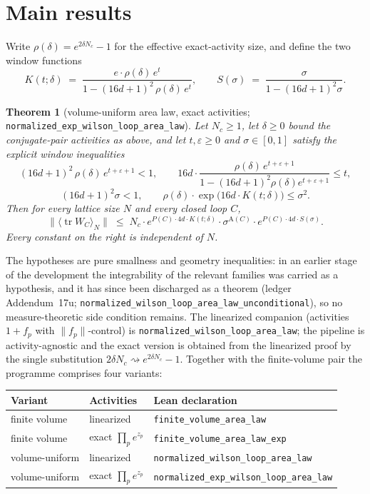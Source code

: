 \documentclass[11pt]{article}
\newtheorem{theorem}{Theorem}[section]
\theoremstyle{remark}
\newcommand{\tr}{\operatorname{tr}}
\newcommand{\loopsupp}{P}
\newcommand{\Area}{\mathrm{A}}
\begin{document}
\section{Main results}\label{sec:results}

Write $\rho(\delta) = e^{2\delta N_c} - 1$ for the effective exact-activity
size, and define the two window functions
\[
  K(t;\delta) \;=\;
    \frac{e \cdot \rho(\delta)\, e^{t}}
         {1 - (16d+1)^2\, \rho(\delta)\, e^{t}},
  \qquad
  S(\sigma) \;=\; \frac{\sigma}{1 - (16d+1)^2 \sigma}.
\]

\begin{theorem}[volume-uniform area law, exact activities;
\texttt{normalized\_exp\_wilson\_loop\_area\_law}]\label{thm:main}
Let $N_c \ge 1$, let $\delta \ge 0$ bound the conjugate-pair activities as
above, and let $t, \varepsilon \ge 0$ and $\sigma \in [0,1]$ satisfy the
explicit window inequalities
\[
  (16d+1)^2\, \rho(\delta)\, e^{t+\varepsilon+1} < 1, \qquad
  16d \cdot
  \frac{\rho(\delta)\, e^{t+\varepsilon+1}}
       {1 - (16d+1)^2 \rho(\delta) e^{t+\varepsilon+1}} \le t,
\]
\[
  (16d+1)^2 \sigma < 1, \qquad
  \rho(\delta)\cdot \exp\!\bigl(16d \cdot K(t;\delta)\bigr) \le \sigma^2 .
\]
Then for every lattice size $N$ and every closed loop $C$,
\[
  \bigl\lVert \langle \tr W_C \rangle_N \bigr\rVert
  \;\le\;
  N_c \cdot
  e^{\loopsupp(C)\cdot 4d \cdot K(t;\delta)} \cdot
  \sigma^{\Area(C)} \cdot
  e^{\loopsupp(C)\cdot 4d \cdot S(\sigma)} .
\]
Every constant on the right is independent of $N$.
\end{theorem}

The hypotheses are pure smallness and geometry inequalities: in an earlier
stage of the development the integrability of the relevant families was
carried as a hypothesis, and it has since been discharged as a theorem
(ledger Addendum~17u; \texttt{normalized\_wilson\_loop\_area\_law\_unconditional}),
so no measure-theoretic side condition remains.  The linearized companion
(activities $1 + f_p$ with $\lVert f_p\rVert$-control) is
\texttt{normalized\_wilson\_loop\_area\_law}; the pipeline is
activity-agnostic and the exact version is obtained from the linearized
proof by the single substitution $2\delta N_c \rightsquigarrow
e^{2\delta N_c}-1$.  Together with the finite-volume pair the programme
comprises four variants:

\begin{center}
\begin{tabular}{lll}
\toprule
Variant & Activities & Lean declaration \\
\midrule
finite volume & linearized & \texttt{finite\_volume\_area\_law} \\
finite volume & exact $\prod_p e^{z_p}$ & \texttt{finite\_volume\_area\_law\_exp} \\
volume-uniform & linearized & \texttt{normalized\_wilson\_loop\_area\_law} \\
volume-uniform & exact $\prod_p e^{z_p}$ & \texttt{normalized\_exp\_wilson\_loop\_area\_law} \\
\bottomrule
\end{tabular}
\end{center}
\end{document}
